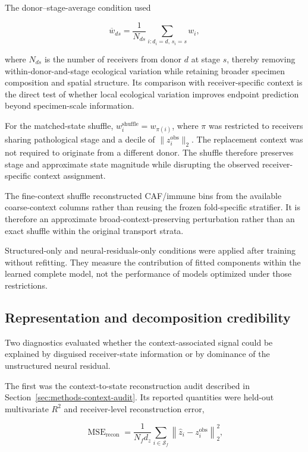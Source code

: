 The donor--stage-average condition used

\begin{equation}
\overline{w}_{ds}
=
\frac{1}{N_{ds}}
\sum_{i:d_i=d,\,s_i=s}
w_i,
\label{eq:methods-donor-stage-average}
\end{equation}

where \(N_{ds}\) is the number of receivers from donor \(d\) at stage \(s\),
thereby removing within-donor-and-stage ecological variation while retaining
broader specimen composition and spatial structure. Its comparison with
receiver-specific context is the direct test of whether local ecological
variation improves endpoint prediction beyond specimen-scale information.

For the matched-state shuffle,
\(w_i^{\mathrm{shuffle}}=w_{\pi(i)}\), where \(\pi\) was restricted to
receivers sharing pathological stage and a decile of
\(\lVert z_i^{\mathrm{obs}}\rVert_2\). The replacement context was not required
to originate from a different donor. The shuffle therefore preserves stage and
approximate state magnitude while disrupting the observed receiver-specific
context assignment.

The fine-context shuffle reconstructed CAF/immune bins from the available
coarse-context columns rather than reusing the frozen fold-specific stratifier.
It is therefore an approximate broad-context-preserving perturbation rather
than an exact shuffle within the original transport strata.

Structured-only and neural-residuals-only conditions were applied after
training without refitting. They measure the contribution of fitted components
within the learned complete model, not the performance of models optimized
under those restrictions.

\subsection{Representation and decomposition credibility}
\label{sec:methods-credibility}

Two diagnostics evaluated whether the context-associated signal could be
explained by disguised receiver-state information or by dominance of the
unstructured neural residual.

The first was the context-to-state reconstruction audit described in
Section~\ref{sec:methods-context-audit}. Its reported quantities were held-out
multivariate \(R^2\) and receiver-level reconstruction error,

\begin{equation}
\operatorname{MSE}_{\mathrm{recon}}
=
\frac{1}{N_f d_z}
\sum_{i\in\mathcal{S}_f}
\left\|
\widehat{z}_i
-
z_i^{\mathrm{obs}}
\right\|_2^2,
\label{eq:methods-context-reconstruction-mse}
\end{equation}

